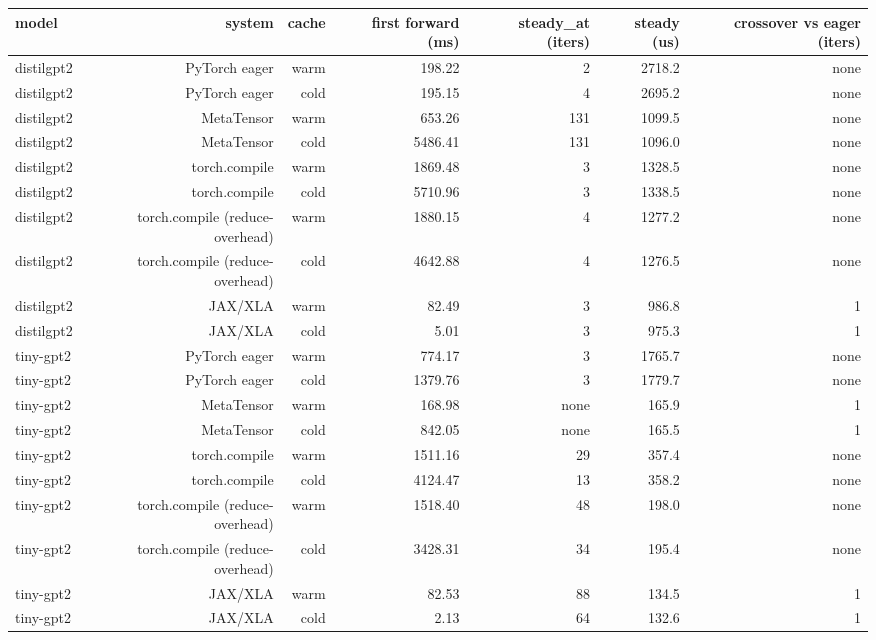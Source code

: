 \begin{tabular}{lrrrrrr}
\toprule
model & system & cache & first forward (ms) & steady\_at (iters) & steady (us) & crossover vs eager (iters) \\
\midrule
distilgpt2 & PyTorch eager & warm & 198.22 & 2 & 2718.2 & none \\
distilgpt2 & PyTorch eager & cold & 195.15 & 4 & 2695.2 & none \\
distilgpt2 & MetaTensor & warm & 653.26 & 131 & 1099.5 & none \\
distilgpt2 & MetaTensor & cold & 5486.41 & 131 & 1096.0 & none \\
distilgpt2 & torch.compile & warm & 1869.48 & 3 & 1328.5 & none \\
distilgpt2 & torch.compile & cold & 5710.96 & 3 & 1338.5 & none \\
distilgpt2 & torch.compile (reduce-overhead) & warm & 1880.15 & 4 & 1277.2 & none \\
distilgpt2 & torch.compile (reduce-overhead) & cold & 4642.88 & 4 & 1276.5 & none \\
distilgpt2 & JAX/XLA & warm & 82.49 & 3 & 986.8 & 1 \\
distilgpt2 & JAX/XLA & cold & 5.01 & 3 & 975.3 & 1 \\
tiny-gpt2 & PyTorch eager & warm & 774.17 & 3 & 1765.7 & none \\
tiny-gpt2 & PyTorch eager & cold & 1379.76 & 3 & 1779.7 & none \\
tiny-gpt2 & MetaTensor & warm & 168.98 & none & 165.9 & 1 \\
tiny-gpt2 & MetaTensor & cold & 842.05 & none & 165.5 & 1 \\
tiny-gpt2 & torch.compile & warm & 1511.16 & 29 & 357.4 & none \\
tiny-gpt2 & torch.compile & cold & 4124.47 & 13 & 358.2 & none \\
tiny-gpt2 & torch.compile (reduce-overhead) & warm & 1518.40 & 48 & 198.0 & none \\
tiny-gpt2 & torch.compile (reduce-overhead) & cold & 3428.31 & 34 & 195.4 & none \\
tiny-gpt2 & JAX/XLA & warm & 82.53 & 88 & 134.5 & 1 \\
tiny-gpt2 & JAX/XLA & cold & 2.13 & 64 & 132.6 & 1 \\
\bottomrule
\end{tabular}
